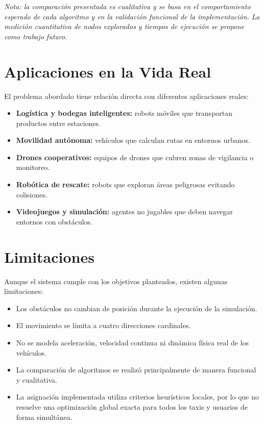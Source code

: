 \documentclass[12pt,a4paper]{article}
\begin{document}
\textit{Nota: la comparación presentada es cualitativa y se basa en el comportamiento esperado de cada algoritmo y en la validación funcional de la implementación. La medición cuantitativa de nodos explorados y tiempos de ejecución se propone como trabajo futuro.}


\section{Aplicaciones en la Vida Real}
\justifying

El problema abordado tiene relación directa con diferentes aplicaciones reales:

\begin{itemize}
    \item \textbf{Logística y bodegas inteligentes:} robots móviles que transportan productos entre estaciones.
    \item \textbf{Movilidad autónoma:} vehículos que calculan rutas en entornos urbanos.
    \item \textbf{Drones cooperativos:} equipos de drones que cubren zonas de vigilancia o monitoreo.
    \item \textbf{Robótica de rescate:} robots que exploran áreas peligrosas evitando colisiones.
    \item \textbf{Videojuegos y simulación:} agentes no jugables que deben navegar entornos con obstáculos.
\end{itemize}

\section{Limitaciones}
\justifying

Aunque el sistema cumple con los objetivos planteados, existen algunas limitaciones:

\begin{itemize}
    \item Los obstáculos no cambian de posición durante la ejecución de la simulación.
    \item El movimiento se limita a cuatro direcciones cardinales.
    \item No se modela aceleración, velocidad continua ni dinámica física real de los vehículos.
    \item La comparación de algoritmos se realizó principalmente de manera funcional y cualitativa.
    \item La asignación implementada utiliza criterios heurísticos locales, por lo que no resuelve una optimización global exacta para todos los taxis y usuarios de forma simultánea.
\end{itemize}
\end{document}
